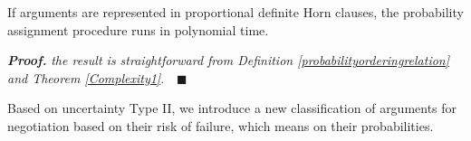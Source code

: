 \begin{theorem}\label{Complexity2}
If arguments are represented in proportional definite Horn clauses, the probability assignment procedure runs in polynomial
time.
\end{theorem}

\noindent\emph{\textbf{Proof.}} \emph{the result is straightforward from Definition \ref{probabilityorderingrelation}
and Theorem \ref{Complexity1}}.~~$\blacksquare$



%

Based on uncertainty Type II, we introduce a new classification of arguments for negotiation based on their risk of failure,
which means on their probabilities.


